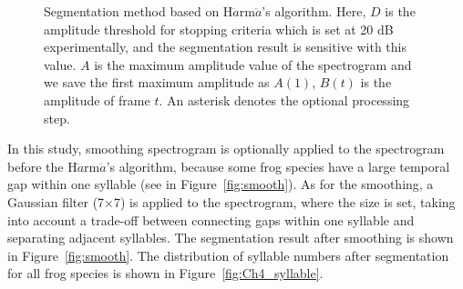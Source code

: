 \begin{figure}[htb!] %
\caption[H$\ddot{a}$rm$\ddot{a}$'s segmentation algorithm]{Segmentation method based on H$\ddot{a}$rm$\ddot{a}$'s algorithm. Here, $D$ is the amplitude threshold for stopping criteria which is set at 20 dB experimentally, and the segmentation result is sensitive with this value. $A$ is the maximum amplitude value of the spectrogram and we save the first maximum amplitude as $A(1)$, $B(t)$ is the amplitude of frame $t$. An asterisk denotes the optional processing step.}
\label{fig:segmentation} 
\end{figure}



In this study, smoothing spectrogram is optionally applied to the spectrogram before the H$\ddot{a}$rm$\ddot{a}$'s algorithm, because some frog species have a large temporal gap within one syllable (see in Figure~\ref{fig:smooth}). As for the smoothing, a Gaussian filter (7$\times$7) is applied to the spectrogram, where the size is set, taking into account a trade-off between connecting gaps within one syllable and separating adjacent syllables. The segmentation result after smoothing is shown in Figure~\ref{fig:smooth}. The distribution of syllable numbers after segmentation for all frog species is shown in Figure~\ref{fig:Ch4_syllable}.

